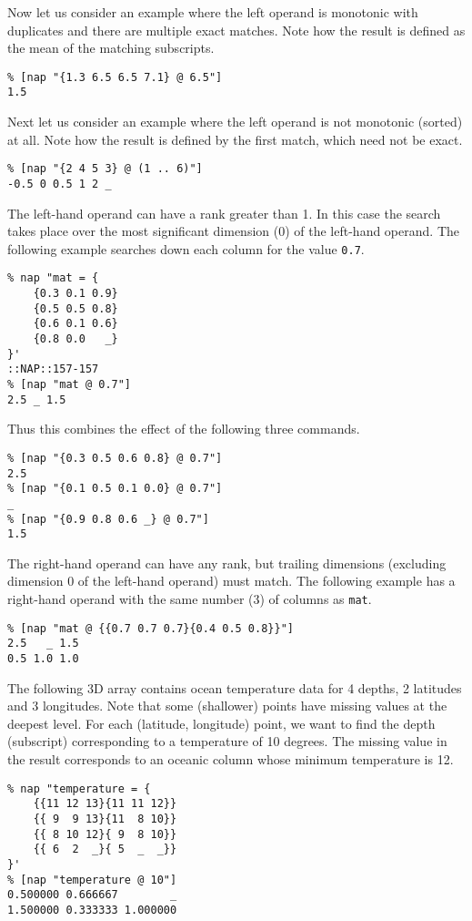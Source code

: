 Now let us consider an example where the left operand
is monotonic with duplicates and there are multiple exact matches.
Note how the result is defined as the mean of the matching subscripts.
  \begin{verbatim}
% [nap "{1.3 6.5 6.5 7.1} @ 6.5"]
1.5
\end{verbatim}

Next let us consider an example where the left operand
is not monotonic (sorted) at all.
Note how the result is defined by the first match, which need not be exact.
  \begin{verbatim}
% [nap "{2 4 5 3} @ (1 .. 6)"]
-0.5 0 0.5 1 2 _
\end{verbatim}

 The left-hand operand can have a rank greater than 1. In this case
  the search takes place over the most significant dimension (0) of the
  left-hand operand. The following example searches down each column
  for the value 
  \texttt{0.7}.
  \begin{verbatim}
% nap "mat = {
    {0.3 0.1 0.9}
    {0.5 0.5 0.8}
    {0.6 0.1 0.6}
    {0.8 0.0   _}
}'
::NAP::157-157
% [nap "mat @ 0.7"]
2.5 _ 1.5
\end{verbatim}

  
 Thus this combines the effect of the following three commands.
  \begin{verbatim}
% [nap "{0.3 0.5 0.6 0.8} @ 0.7"]
2.5
% [nap "{0.1 0.5 0.1 0.0} @ 0.7"]
_
% [nap "{0.9 0.8 0.6 _} @ 0.7"]
1.5
\end{verbatim}

  
 The right-hand operand can have any rank, but trailing dimensions
  (excluding dimension 0 of the left-hand operand) must match. The
  following example has a right-hand operand with the same number (3)
  of columns as 
  \texttt{mat}.
  \begin{verbatim}
% [nap "mat @ {{0.7 0.7 0.7}{0.4 0.5 0.8}}"]
2.5   _ 1.5
0.5 1.0 1.0
\end{verbatim}

  
 The following 3D array contains ocean temperature data for 4
  depths, 2 latitudes and 3 longitudes. Note that some (shallower)
  points have missing values at the deepest level. For each (latitude,
  longitude) point, we want to find the depth (subscript) corresponding
  to a temperature of 10 degrees. The missing value in the result
  corresponds to an oceanic column whose minimum temperature is 12.
  \begin{verbatim}
% nap "temperature = {
    {{11 12 13}{11 11 12}}
    {{ 9  9 13}{11  8 10}}
    {{ 8 10 12}{ 9  8 10}}
    {{ 6  2  _}{ 5  _  _}}
}'
% [nap "temperature @ 10"]
0.500000 0.666667        _
1.500000 0.333333 1.000000
\end{verbatim}

